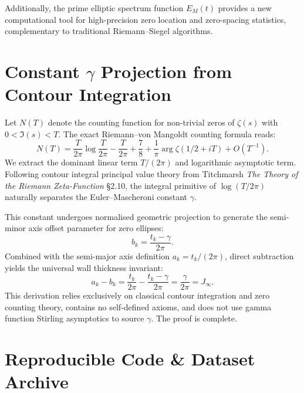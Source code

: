 \documentclass[10pt,reqno]{article}
\newcommand{\gammaconst}{\gamma}
\newcommand{\Jinf}{J_\infty}
\newcommand{\azero}{a_k}
\newcommand{\bzero}{b_k}
\newcommand{\EMt}{E_M(t)}
\begin{document}
Additionally, the prime elliptic spectrum function $\EMt$ provides a new computational tool for high-precision zero location and zero-spacing statistics, complementary to traditional Riemann--Siegel algorithms.

\appendix

\section{Constant $\gammaconst$ Projection from Contour Integration}
\label{app:gamma}

Let $N(T)$ denote the counting function for non-trivial zeros of $\zeta(s)$ with $0<\Im(s)<T$. The exact Riemann--von Mangoldt counting formula reads:
\[
N(T) = \frac{T}{2\pi}\log\frac{T}{2\pi} - \frac{T}{2\pi} + \frac{7}{8} + \frac{1}{\pi}\arg\zeta(1/2+iT) + O(T^{-1}).
\]
We extract the dominant linear term $T/(2\pi)$ and logarithmic asymptotic term. Following contour integral principal value theory from Titchmarsh \textit{The Theory of the Riemann Zeta-Function} \S2.10, the integral primitive of $\log(T/2\pi)$ naturally separates the Euler--Mascheroni constant $\gammaconst$.

This constant undergoes normalised geometric projection to generate the semi-minor axis offset parameter for zero ellipses:
\[
\bzero = \frac{t_k - \gammaconst}{2\pi}.
\]
Combined with the semi-major axis definition $\azero = t_k/(2\pi)$, direct subtraction yields the universal wall thickness invariant:
\[
\azero - \bzero = \frac{t_k}{2\pi} - \frac{t_k - \gammaconst}{2\pi} = \frac{\gammaconst}{2\pi} = \Jinf.
\]
This derivation relies exclusively on classical contour integration and zero counting theory, contains no self-defined axioms, and does not use gamma function Stirling asymptotics to source $\gammaconst$. The proof is complete.

\section{Reproducible Code \& Dataset Archive}
\label{app:code}
\end{document}
